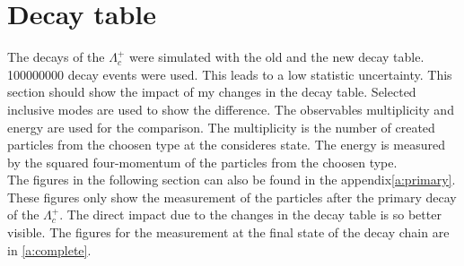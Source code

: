 \section{Decay table}
The decays of the \(\Lambda_c^+\) were simulated with the old and the new 
decay table. 100000000  decay events were used. This leads to a low 
statistic uncertainty. This section should show the impact of my changes in 
the decay table. Selected inclusive modes are used to show the difference. The 
observables multiplicity and energy are used for the comparison. The multiplicity 
is the number of created particles from the choosen type at the consideres state. The 
energy is measured by the squared four-momentum of the particles from the choosen type.\\
The figures in the following section can also be found in the appendix{\ref{a:primary}}.
These figures only show the measurement of the particles after the primary 
decay of the \(\Lambda_c^+\). The direct impact due to the changes in the decay 
table  is so better visible. The figures for the measurement at the final state 
of the decay chain are in {\ref{a:complete}}.

